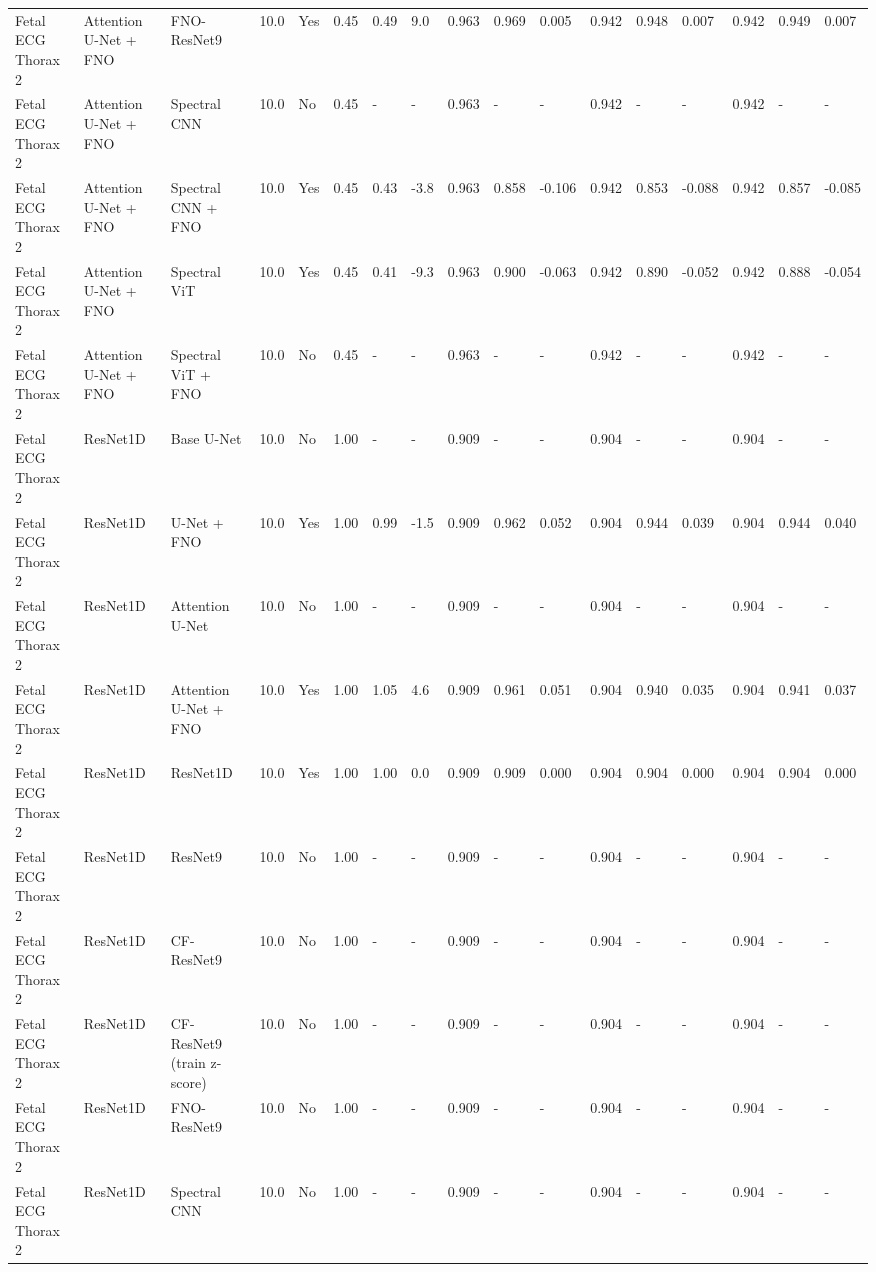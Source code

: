 \begin{longtable}{lllllllllllllllll}
Fetal ECG Thorax 2 & Attention U-Net + FNO & FNO-ResNet9 & 10.0 & Yes & 0.45 & 0.49 & 9.0 & 0.963 & 0.969 & 0.005 & 0.942 & 0.948 & 0.007 & 0.942 & 0.949 & 0.007 \\
Fetal ECG Thorax 2 & Attention U-Net + FNO & Spectral CNN & 10.0 & No & 0.45 & - & - & 0.963 & - & - & 0.942 & - & - & 0.942 & - & - \\
Fetal ECG Thorax 2 & Attention U-Net + FNO & Spectral CNN + FNO & 10.0 & Yes & 0.45 & 0.43 & -3.8 & 0.963 & 0.858 & -0.106 & 0.942 & 0.853 & -0.088 & 0.942 & 0.857 & -0.085 \\
Fetal ECG Thorax 2 & Attention U-Net + FNO & Spectral ViT & 10.0 & Yes & 0.45 & 0.41 & -9.3 & 0.963 & 0.900 & -0.063 & 0.942 & 0.890 & -0.052 & 0.942 & 0.888 & -0.054 \\
Fetal ECG Thorax 2 & Attention U-Net + FNO & Spectral ViT + FNO & 10.0 & No & 0.45 & - & - & 0.963 & - & - & 0.942 & - & - & 0.942 & - & - \\
Fetal ECG Thorax 2 & ResNet1D & Base U-Net & 10.0 & No & 1.00 & - & - & 0.909 & - & - & 0.904 & - & - & 0.904 & - & - \\
Fetal ECG Thorax 2 & ResNet1D & U-Net + FNO & 10.0 & Yes & 1.00 & 0.99 & -1.5 & 0.909 & 0.962 & 0.052 & 0.904 & 0.944 & 0.039 & 0.904 & 0.944 & 0.040 \\
Fetal ECG Thorax 2 & ResNet1D & Attention U-Net & 10.0 & No & 1.00 & - & - & 0.909 & - & - & 0.904 & - & - & 0.904 & - & - \\
Fetal ECG Thorax 2 & ResNet1D & Attention U-Net + FNO & 10.0 & Yes & 1.00 & 1.05 & 4.6 & 0.909 & 0.961 & 0.051 & 0.904 & 0.940 & 0.035 & 0.904 & 0.941 & 0.037 \\
Fetal ECG Thorax 2 & ResNet1D & ResNet1D & 10.0 & Yes & 1.00 & 1.00 & 0.0 & 0.909 & 0.909 & 0.000 & 0.904 & 0.904 & 0.000 & 0.904 & 0.904 & 0.000 \\
Fetal ECG Thorax 2 & ResNet1D & ResNet9 & 10.0 & No & 1.00 & - & - & 0.909 & - & - & 0.904 & - & - & 0.904 & - & - \\
Fetal ECG Thorax 2 & ResNet1D & CF-ResNet9 & 10.0 & No & 1.00 & - & - & 0.909 & - & - & 0.904 & - & - & 0.904 & - & - \\
Fetal ECG Thorax 2 & ResNet1D & CF-ResNet9 (train z-score) & 10.0 & No & 1.00 & - & - & 0.909 & - & - & 0.904 & - & - & 0.904 & - & - \\
Fetal ECG Thorax 2 & ResNet1D & FNO-ResNet9 & 10.0 & No & 1.00 & - & - & 0.909 & - & - & 0.904 & - & - & 0.904 & - & - \\
Fetal ECG Thorax 2 & ResNet1D & Spectral CNN & 10.0 & No & 1.00 & - & - & 0.909 & - & - & 0.904 & - & - & 0.904 & - & - \\

\end{longtable}
